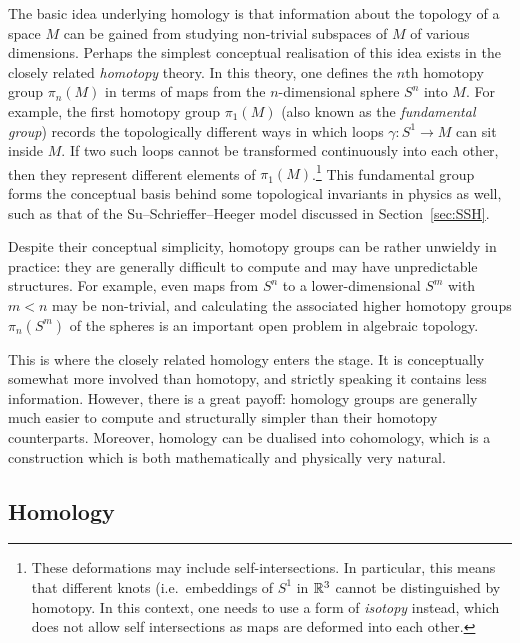 The basic idea underlying homology is that information about the topology of a space $M$ can be gained from studying non-trivial subspaces of $M$ of various dimensions. Perhaps the simplest conceptual realisation of this idea exists in the closely related \emph{homotopy} theory. In this theory, one defines the $n$th homotopy group $\pi_n(M)$ in terms of maps from the $n$-dimensional sphere $S^n$ into $M$. For example, the first homotopy group $\pi_1(M)$ (also known as the \emph{fundamental group}) records the topologically different ways in which loops $\gamma:S^1\to M$ can sit inside $M$. If two such loops cannot be transformed continuously into each other, then they represent different elements of $\pi_1(M)$.\footnote{
	These deformations may include self-intersections. In particular, this means that different knots (i.e.\ embeddings of $S^1$ in $\mathbb{R}^3$ cannot be distinguished by homotopy. In this context, one needs to use a form of \emph{isotopy} instead, which does not allow self intersections as maps are deformed into each other.}
This fundamental group forms the conceptual basis behind some topological invariants in physics as well, such as that of the Su--Schrieffer--Heeger model discussed in Section~\ref{sec:SSH}.

Despite their conceptual simplicity, homotopy groups can be rather unwieldy in practice: they are generally difficult to compute and may have unpredictable structures. For example, even maps from $S^n$ to a lower-dimensional $S^m$ with $m<n$ may be non-trivial, and calculating the associated higher homotopy groups $\pi_n(S^m)$ of the spheres is an important open problem in algebraic topology.

This is where the closely related homology enters the stage. It is conceptually somewhat more involved than homotopy, and strictly speaking it contains less information. However, there is a great payoff: homology groups are generally much easier to compute and structurally simpler than their homotopy counterparts. Moreover, homology can be dualised into cohomology, which is a construction which is both mathematically and physically very natural.


\subsection{Homology}

